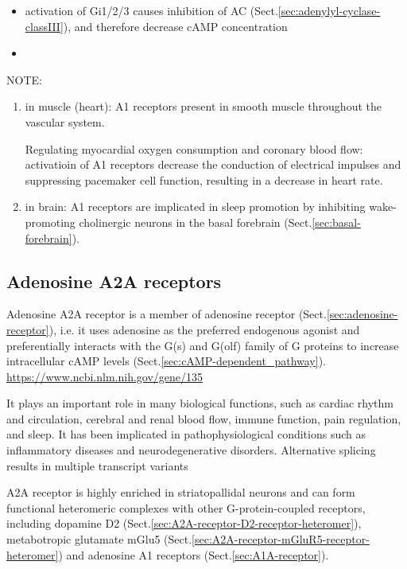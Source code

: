 \begin{itemize}
  \item activation of Gi1/2/3 causes inhibition of AC
  (Sect.\ref{sec:adenylyl-cyclase-classIII}), and therefore decrease cAMP
  concentration
  
  \item 
\end{itemize}

NOTE: 
\begin{enumerate}
  \item in muscle (heart): A1 receptors present in smooth muscle throughout the
  vascular system.
  
Regulating myocardial oxygen consumption and coronary blood flow: activatioin of
A1 receptors decrease the conduction of electrical impulses and suppressing
pacemaker cell function, resulting in a decrease in heart rate.
  
  \item in brain:
  A1 receptors are implicated in sleep promotion by inhibiting wake-promoting
  cholinergic neurons in the basal forebrain (Sect.\ref{sec:basal-forebrain}).
  
\end{enumerate}



\subsection{Adenosine A2A receptors}
\label{sec:A2A-receptor}
\label{sec:Adenosine-A2A-receptor}

Adenosine A2A receptor is a member of adenosine receptor
(Sect.\ref{sec:adenosine-receptor}), i.e. it uses adenosine as the preferred
endogenous agonist and preferentially interacts with the G(s) and G(olf) family
of G proteins to increase intracellular cAMP levels
(Sect.\ref{sec:cAMP-dependent_pathway}).
\url{https://www.ncbi.nlm.nih.gov/gene/135}


It plays an important role in many biological functions, such as cardiac
rhythm and circulation, cerebral and renal blood flow, immune function, pain
regulation, and sleep. It has been implicated in pathophysiological conditions
such as inflammatory diseases and neurodegenerative disorders. Alternative
splicing results in multiple transcript variants

A2A receptor is highly enriched in striatopallidal neurons and can form
functional heteromeric complexes with other G-protein-coupled receptors,
including dopamine D2 (Sect.\ref{sec:A2A-receptor-D2-receptor-heteromer}),
metabotropic glutamate mGlu5
(Sect.\ref{sec:A2A-receptor-mGluR5-receptor-heteromer}) and adenosine A1
receptors (Sect.\ref{sec:A1A-receptor}).

